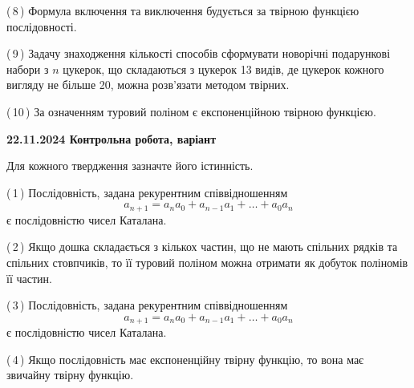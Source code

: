 \documentclass[12pt, ukrainian]{article}
\begin{document}
\begin {large}
\begin {large}
\begin {large}
\begin {large}
\begin {large}
\begin {large}
\begin {large}
\begin {large}
\begin {large}
\begin {large}
\begin {large}
\begin {large}
\begin {large}
\begin {large}
\begin {large}
\begin {large}
\begin {large}
\begin {large}
\begin {large}
\begin {large}
\begin {large}
\begin {large}
\begin {large}
\begin {large}
\begin {large}
\begin {large}
\begin {large}
\begin {large}
\begin {large}
\begin {large}
\begin {large}
\begin {large}
\begin {large}
\begin {large}
\begin {large}
\begin {large}
\begin {large}
\begin {large}
\begin {large}
\begin {large}
\begin {large}
\begin {large}
\begin {large}
{(\,8\,) Формула включення та виключення будується за твірною функцією послідовності.%



(\,9\,) Задачу знаходження кількості способів сформувати новорічні подарункові набори з $n$ цукерок, що складаються з цукерок 13 видів, де цукерок кожного вигляду не більше 20, можна розв’язати методом твірних.%



(\,10\,) За означенням туровий поліном є експоненційною твірною функцією.%




\vspace{5mm}
}
\newpage

\begin {large}

\textbf{22.11.2024 Контрольна робота, варіант  }\par


{
Для кожного твердження зазначте його істинність.\par

\vspace{2mm}

(\,1\,) Послідовність, задана рекурентним співвідношенням $$a_{n+1}=a_{n}a_{0}+a_{n-1}a_{1}+\ldots+a_0a_{n}$$ є послідовністю чисел Каталана.%



(\,2\,) Якщо дошка складається з кількох частин, що не мають спільних рядків та спільних стовпчиків, то її туровий поліном можна отримати як добуток поліномів її частин.%



(\,3\,) Послідовність, задана рекурентним співвідношенням $$a_{n+1}=a_{n}a_{0}+a_{n-1}a_{1}+\ldots+a_0a_{n}$$ є послідовністю чисел Каталана.%



(\,4\,) Якщо послідовність має експоненційну твірну функцію, то вона має звичайну твірну функцію.%



}
\end{large}
\end{large}
\end{large}
\end{large}
\end{large}
\end{large}
\end{large}
\end{large}
\end{large}
\end{large}
\end{large}
\end{large}
\end{large}
\end{large}
\end{large}
\end{large}
\end{large}
\end{large}
\end{large}
\end{large}
\end{large}
\end{large}
\end{large}
\end{large}
\end{large}
\end{large}
\end{large}
\end{large}
\end{large}
\end{large}
\end{large}
\end{large}
\end{large}
\end{large}
\end{large}
\end{large}
\end{large}
\end{large}
\end{large}
\end{large}
\end{large}
\end{large}
\end{large}
\end{large}
\end{document}
